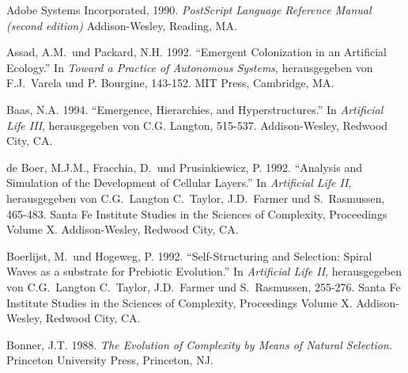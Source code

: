 
\begin{thebibliography}{99}

Adobe Systems Incorporated, 1990. \textsl{PostScript Language Reference Manual (second edition)}
Addison-Wesley, Reading, MA.

Assad, A.M.\ und Packard, N.H. 1992. "`Emergent Colonization in an Artificial Ecology."'
In \textsl{Toward a Practice of Autonomous Systems}, herausgegeben von F.J.\ Varela
und P. Bourgine, 143-152. MIT Press, Cambridge, MA.

Baas, N.A. 1994. "`Emergence, Hierarchies, and Hyperstructures."' In
\textsl{Artificial Life III}, herausgegeben von C.G. Langton, 515-537.
Addison-Wesley, Redwood City, CA.



de Boer, M.J.M., Fracchia, D.\ und Prusinkiewicz, P. 1992. "`Analysis and Simulation of the Development of Cellular Layers."'
In \textsl{Artificial Life II}, herausgegeben von C.G.\ Langton 
C.\ Taylor, J.D.\ Farmer und S.\ Rasmussen, 465-483. Santa Fe
Institute Studies in the Sciences of Complexity, Proceedings Volume X.
Addison-Wesley, Redwood City, CA.

Boerlijst, M.\ und Hogeweg, P. 1992. "`Self-Structuring and Selection: Spiral
Waves as a substrate for Prebiotic Evolution."'
In \textsl{Artificial Life II}, herausgegeben von C.G.\ Langton 
C.\ Taylor, J.D.\ Farmer und S.\ Rasmussen, 255-276. Santa Fe
Institute Studies in the Sciences of Complexity, Proceedings Volume X.
Addison-Wesley, Redwood City, CA.

Bonner, J.T. 1988. \textsl{The Evolution of Complexity by Means of Natural Selection.}
Princeton University Press, Princeton, NJ.


\end{thebibliography}
